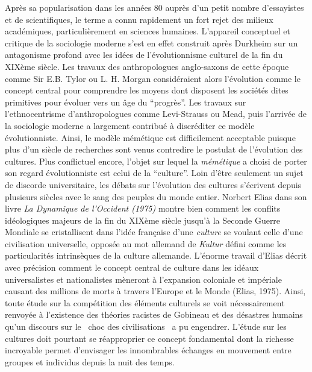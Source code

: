 Apr\`es sa popularisation dans les ann\'ees 80 aupr\`es d{\textquoteright}un petit nombre d{\textquoteright}essayistes et de scientifiques, le terme a connu rapidement un fort rejet des milieux acad\'emiques, particuli\`erement en sciences humaines. L{\textquoteright}appareil conceptuel et critique de la sociologie moderne s{\textquoteright}est en effet construit apr\`es Durkheim sur un antagonisme profond avec les id\'ees de l{\textquoteright}\'evolutionnisme culturel de la fin du XIX\`eme si\`ecle. Les travaux des anthropologues anglo-saxons de cette \'epoque comme Sir E.B. Tylor ou L. H. Morgan consid\'eraient alors l{\textquoteright}\'evolution comme le concept central pour comprendre les moyens dont disposent les soci\'et\'es dites primitives pour \'evoluer vers un \^age du {\textquotedblleft}progr\`es{\textquotedblright}. Les travaux sur l{\textquoteright}ethnocentrisme d{\textquoteright}anthropologues comme Levi-Strauss ou Mead, puis l{\textquoteright}arriv\'ee de la sociologie moderne a largement contribu\'e \`a discr\'editer ce mod\`ele \'evolutionniste. Ainsi, le mod\`ele m\'em\'etique est difficilement acceptable puisque plus d{\textquoteright}un si\`ecle de recherches sont venus contredire le postulat de l{\textquoteright}\'evolution des cultures. Plus conflictuel encore, l{\textquoteright}objet sur lequel la \textit{m\'em\'etique} a choisi de porter son regard \'evolutionniste est celui de la {\textquotedblleft}culture{\textquotedblright}. Loin d{\textquoteright}\^etre seulement un sujet de discorde universitaire, les d\'ebats sur l{\textquoteright}\'evolution des cultures s{\textquoteright}\'ecrivent depuis plusieurs si\`ecles avec le sang des peuples du monde entier. Norbert Elias dans son livre \textit{La Dynamique de l{\textquoteright}Occident (1975) }montre bien comment les conflits id\'eologiques majeurs de la fin du XIX\`eme si\`ecle jusqu{\textquoteright}\`a la Seconde Guerre Mondiale se cristallisent dans l{\textquoteright}id\'ee fran\c{c}aise d{\textquoteright}une \textit{culture} se voulant celle d{\textquoteright}une civilisation universelle, oppos\'ee au mot allemand de \textit{Kultur} d\'efini comme les particularit\'es intrins\`eques de la culture allemande. L{\textquoteright}\'enorme travail d{\textquoteright}Elias d\'ecrit avec pr\'ecision comment le concept central de culture dans les id\'eaux universalistes et nationalistes m\`eneront \`a l{\textquoteright}expansion coloniale et imp\'eriale causant des millions de morts \`a travers l{\textquoteright}Europe et le Monde (Elias, 1975). Ainsi, toute \'etude sur la comp\'etition des \'el\'ements culturels se voit n\'ecessairement renvoy\'ee \`a l{\textquoteright}existence des th\'eories racistes de Gobineau et des d\'esastres humains qu{\textquoteright}un discours sur le {\guillemotleft}~choc des civilisations~{\guillemotright} \cite{Huntington2011} a pu engendrer. L{\textquoteright}\'etude sur les cultures doit pourtant se r\'eapproprier ce concept fondamental dont la richesse incroyable permet d{\textquoteright}envisager les innombrables \'echanges en mouvement entre groupes et individus depuis la nuit des temps. 
